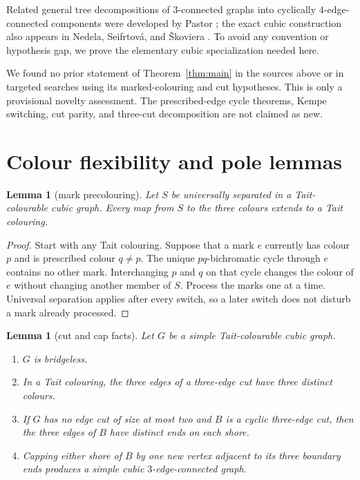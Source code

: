 \documentclass[11pt]{article}
\newtheorem{lemma}[theorem]{Lemma}
\theoremstyle{definition}
\theoremstyle{remark}
\begin{document}
Related general tree decompositions of \(3\)-connected graphs into
cyclically \(4\)-edge-connected components were developed by Pastor
\cite{pastor2018}; the exact cubic construction also appears in
Nedela, Seifrtov\'a, and \v Skoviera \cite[Section~6]{nedela2024}.
To avoid any convention or hypothesis gap, we prove the elementary
cubic specialization needed here.

We found no prior statement of Theorem~\ref{thm:main} in the sources
above or in targeted searches using its marked-colouring and cut
hypotheses.  This is only a provisional novelty assessment.  The
prescribed-edge cycle theorems, Kempe switching, cut parity, and
three-cut decomposition are not claimed as new.

\section{Colour flexibility and pole lemmas}

\begin{lemma}[mark precolouring]\label{lem:precolour}
Let \(S\) be universally separated in a Tait-colourable cubic graph.
Every map from \(S\) to the three colours extends to a Tait colouring.
\end{lemma}

\begin{proof}
Start with any Tait colouring.  Suppose that a mark \(e\) currently has
colour \(p\) and is prescribed colour \(q\ne p\).  The unique
\(pq\)-bichromatic cycle through \(e\) contains no other mark.
Interchanging \(p\) and \(q\) on that cycle changes the colour of \(e\)
without changing another member of \(S\).  Process the marks one at a
time.  Universal separation applies after every switch, so a later
switch does not disturb a mark already processed.
\end{proof}

\begin{lemma}[cut and cap facts]\label{lem:capfacts}
Let \(G\) be a simple Tait-colourable cubic graph.
\begin{enumerate}
  \item \(G\) is bridgeless.
  \item In a Tait colouring, the three edges of a three-edge cut have
        three distinct colours.
  \item If \(G\) has no edge cut of size at most two and \(B\) is a
        cyclic three-edge cut, then the three edges of \(B\) have
        distinct ends on each shore.
  \item Capping either shore of \(B\) by one new vertex adjacent to its
        three boundary ends produces a simple cubic
        \(3\)-edge-connected graph.
\end{enumerate}
\end{lemma}
\end{document}
